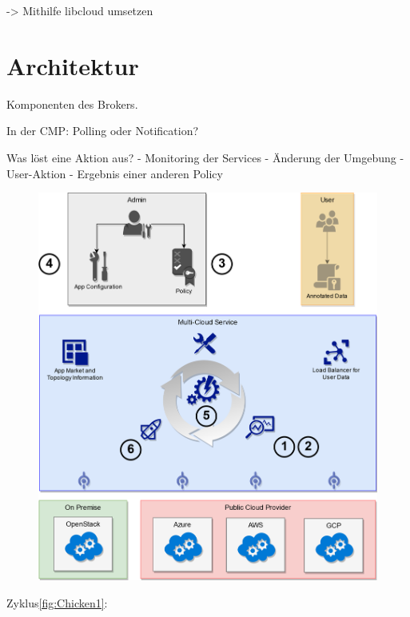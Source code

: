 -> Mithilfe libcloud umsetzen 


\section{Architektur}

Komponenten des Brokers.


In der CMP: Polling oder Notification?

Was löst eine Aktion aus?
- Monitoring der Services
- Änderung der Umgebung
- User-Aktion
- Ergebnis einer anderen Policy

\begin{figure}
	\centering
	\includegraphics[width=0.9\linewidth]{images/cycle}
	\caption{}
	\label{fig:Chicken1}
\end{figure}

Zyklus\autoref{fig:Chicken1}:

